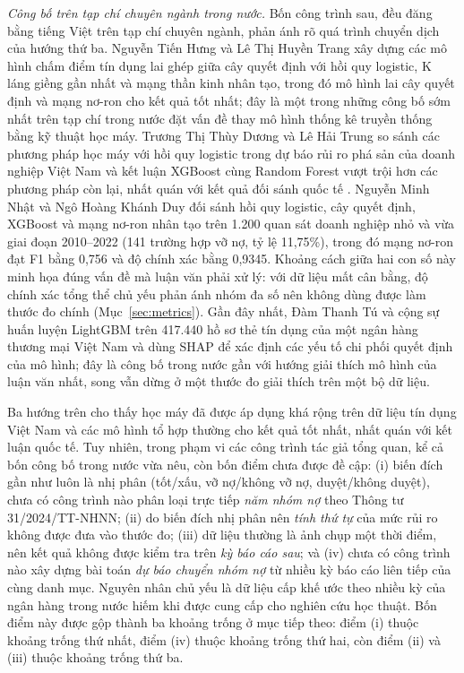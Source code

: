 \noindent\textit{Công bố trên tạp chí chuyên ngành trong nước.} Bốn công trình sau, đều đăng bằng tiếng Việt trên tạp chí chuyên ngành, phản ánh rõ quá trình chuyển dịch của hướng thứ ba. Nguyễn Tiến Hưng và Lê Thị Huyền Trang \cite{hung2018chamdiem} xây dựng các mô hình chấm điểm tín dụng lai ghép giữa cây quyết định với hồi quy logistic, K láng giềng gần nhất và mạng thần kinh nhân tạo, trong đó mô hình lai cây quyết định và mạng nơ-ron cho kết quả tốt nhất; đây là một trong những công bố sớm nhất trên tạp chí trong nước đặt vấn đề thay mô hình thống kê truyền thống bằng kỹ thuật học máy. Trương Thị Thùy Dương và Lê Hải Trung \cite{duong2023phasan} so sánh các phương pháp học máy với hồi quy logistic trong dự báo rủi ro phá sản của doanh nghiệp Việt Nam và kết luận XGBoost cùng Random Forest vượt trội hơn các phương pháp còn lại, nhất quán với kết quả đối sánh quốc tế \cite{lessmann2015benchmarking,xia2017boosted}. Nguyễn Minh Nhật và Ngô Hoàng Khánh Duy \cite{nhat2024sme} đối sánh hồi quy logistic, cây quyết định, XGBoost và mạng nơ-ron nhân tạo trên 1.200 quan sát doanh nghiệp nhỏ và vừa giai đoạn 2010--2022 (141 trường hợp vỡ nợ, tỷ lệ 11,75\%), trong đó mạng nơ-ron đạt F1 bằng 0,756 và độ chính xác bằng 0,9345. Khoảng cách giữa hai con số này minh họa đúng vấn đề mà luận văn phải xử lý: với dữ liệu mất cân bằng, độ chính xác tổng thể chủ yếu phản ánh nhóm đa số nên không dùng được làm thước đo chính (Mục~\ref{sec:metrics}). Gần đây nhất, Đàm Thanh Tú và cộng sự \cite{dam2025xai} huấn luyện LightGBM trên 417.440 hồ sơ thẻ tín dụng của một ngân hàng thương mại Việt Nam và dùng SHAP để xác định các yếu tố chi phối quyết định của mô hình; đây là công bố trong nước gần với hướng giải thích mô hình của luận văn nhất, song vẫn dừng ở một thước đo giải thích trên một bộ dữ liệu.

Ba hướng trên cho thấy học máy đã được áp dụng khá rộng trên dữ liệu tín dụng Việt Nam và các mô hình tổ hợp thường cho kết quả tốt nhất, nhất quán với kết luận quốc tế. Tuy nhiên, trong phạm vi các công trình tác giả tổng quan, kể cả bốn công bố trong nước vừa nêu, còn bốn điểm chưa được đề cập: (i) biến đích gần như luôn là nhị phân (tốt/xấu, vỡ nợ/không vỡ nợ, duyệt/không duyệt), chưa có công trình nào phân loại trực tiếp \emph{năm nhóm nợ} theo Thông tư 31/2024/TT-NHNN; (ii) do biến đích nhị phân nên \emph{tính thứ tự} của mức rủi ro không được đưa vào thước đo; (iii) dữ liệu thường là ảnh chụp một thời điểm, nên kết quả không được kiểm tra trên \emph{kỳ báo cáo sau}; và (iv) chưa có công trình nào xây dựng bài toán \emph{dự báo chuyển nhóm nợ} từ nhiều kỳ báo cáo liên tiếp của cùng danh mục. Nguyên nhân chủ yếu là dữ liệu cấp khế ước theo nhiều kỳ của ngân hàng trong nước hiếm khi được cung cấp cho nghiên cứu học thuật. Bốn điểm này được gộp thành ba khoảng trống ở mục tiếp theo: điểm (i) thuộc khoảng trống thứ nhất, điểm (iv) thuộc khoảng trống thứ hai, còn điểm (ii) và (iii) thuộc khoảng trống thứ ba.

